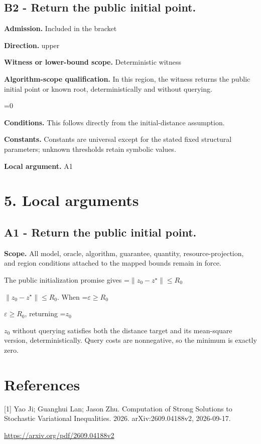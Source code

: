 \documentclass[10pt,a4paper]{article}
\newcommand{\AtlasMath}[1]{\par\begingroup\centering\setbox0=\hbox{$\displaystyle #1$}\ifdim\wd0>1.4\linewidth\typeout{ATLAS WIDE FORMULA: \the\wd0}\fi\ifdim\wd0>\linewidth\resizebox{\linewidth}{!}{\box0}\else\box0\fi\par\endgroup}
\newcommand{\AtlasInlineMath}[1]{\begingroup\setbox0=\hbox{$#1$}\ifdim\wd0>.4\linewidth\endgroup\AtlasMath{#1}\else\endgroup$#1$\fi}
\begin{document}
\subsection{B2 - Return the public initial point.}
\textbf{Admission.} Included in the bracket

\textbf{Direction.} upper

\textbf{Witness or lower-bound scope.} Deterministic witness

\textbf{Algorithm-scope qualification.} In this region, the witness returns the public initial point or known root, deterministically and without querying.

\AtlasMath{0}
\textbf{Conditions.} This follows directly from the initial-distance assumption.

\textbf{Constants.} Constants are universal except for the stated fixed structural parameters; unknown thresholds retain symbolic values.

\textbf{Local argument.} A1

\section{5. Local arguments}
\subsection{A1 - Return the public initial point.}
\textbf{Scope.} All model, oracle, algorithm, guarantee, quantity, resource-projection, and region conditions attached to the mapped bounds remain in force.

The public initialization promise gives \AtlasInlineMath{\|z_0-z^\star\|\le R_0}. When \AtlasInlineMath{\varepsilon\ge R_0}, returning \AtlasInlineMath{z_0} without querying satisfies both the distance target and its mean-square version, deterministically. Query costs are nonnegative, so the minimum is exactly zero.

\section{References}
[1] Yao Ji; Guanghui Lan; Jason Zhu. Computation of Strong Solutions to Stochastic Variational Inequalities. 2026. arXiv:2609.04188v2, 2026-09-17.

\url{https://arxiv.org/pdf/2609.04188v2}
\end{document}
